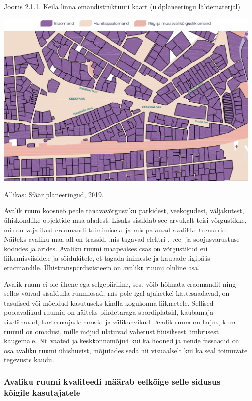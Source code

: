 \documentclass[estonian,]{article}
\begin{document}
{Joonis 2.1.1.} Keila linna omandistruktuuri kaart (üldplaneeringu lähtematerjal)

\begin{center}\includegraphics[width=0.9\linewidth]{figures/2-chapter/fig211} \end{center}

\begin{imgsource}
{Allikas:} Sfäär planeeringud, 2019.
\end{imgsource}

Avalik ruum koosneb peale tänavavõrgustiku parkidest, veekogudest, väljakutest, ühiskondlike objektide maa-aladest. Lisaks sisaldab see arvukalt teisi võrgustikke, mis on vajalikud eraomandi toimimiseks ja mis pakuvad avalikke teenuseid. Näiteks avaliku maa all on trassid, mis tagavad elektri-, vee- ja soojusvarustuse kodudes ja ärides. Avaliku ruumi maapealses osas on võrgustikud eri liikumisviisidele ja sõidukitele, et tagada inimeste ja kaupade ligipääs eraomandile. Ühistranspordisüsteem on avaliku ruumi oluline osa.

Avalik ruum ei ole ühene ega selgepiiriline, sest võib hõlmata eraomandit ning selles võivad sisalduda ruumiosad, mis pole igal ajahetkel kättesaadavad, on tasulised või mõeldud kasutuseks kindla kogukonna liikmetele. Sellised poolavalikud ruumid on näiteks piirdetaraga spordiplatsid, kaubamaja sisetänavad, kortermajade hoovid ja välikohvikud. Avalik ruum on hajus, kuna ruumil on omadusi, mille mõjud ulatuvad vahetust füüsilisest ümbrusest kaugemale. Nii vaated ja keskkonnamõjud kui ka hooned ja nende fassaadid on osa avaliku ruumi ühishuvist, mõjutades seda nii visuaalselt kui ka seal toimuvate tegevuste kaudu.

\hypertarget{avaliku-ruumi-kvaliteedi-muxe4uxe4rab-eelkuxf5ige-selle-sidusus-kuxf5igile-kasutajatele}{%
\subsubsection*{Avaliku ruumi kvaliteedi määrab eelkõige selle sidusus kõigile kasutajatele}\label{avaliku-ruumi-kvaliteedi-muxe4uxe4rab-eelkuxf5ige-selle-sidusus-kuxf5igile-kasutajatele}}
\end{document}
